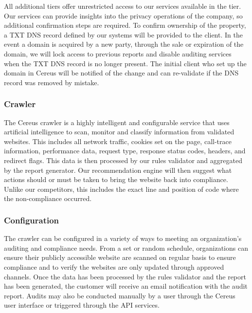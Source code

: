 
All additional tiers offer unrestricted access to our services available in the tier. Our services can provide insights into the privacy operations of the company, so additional confirmation steps are required. To confirm ownership of the property, a TXT DNS record defined by our systems will be provided to the client. In the event a domain is acquired by a new party, through the sale or expiration of the domain, we will lock access to previous reports and disable auditing services when the TXT DNS record is no longer present. The initial client who set up the domain in Cereus will be notified of the change and can re-validate if the DNS record was removed by mistake.

\subsubsection{Crawler}

The Cereus crawler is a highly intelligent and configurable service that uses artificial intelligence to scan, monitor and classify information from validated websites. This includes all network traffic, cookies set on the page, call-trace information, performance data, request type, response status codes, headers, and redirect flags. This data is then processed by our rules validator and aggregated by the report generator. Our recommendation engine will then suggest what actions should or must be taken to bring the website back into compliance. Unlike our competitors, this includes the exact line and position of code where the non-compliance occurred.

\subsubsection*{Configuration}

The crawler can be configured in a variety of ways to meeting an organization’s auditing and compliance needs. From a set or random schedule, organizations can ensure their publicly accessible website are scanned on regular basis to ensure compliance and to verify the websites are only updated through approved channels. Once the data has been processed by the rules validator and the report has been generated, the customer will receive an email notification with the audit report. Audits may also be conducted manually by a user through the Cereus user interface or triggered through the API services.

